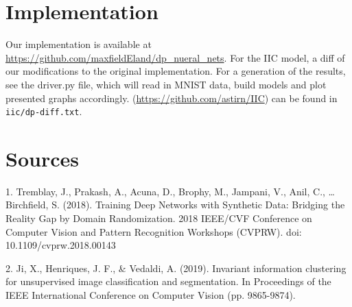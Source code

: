 \documentclass[12pt]{report}
\begin{document}
\section{Implementation}
Our implementation is available at \url{https://github.com/maxfieldEland/dp_nueral_nets}. For the IIC model, a diff of our modifications to the original implementation. For a generation of the results, see the driver.py file, which will read in MNIST data, build models and plot presented graphs accordingly.  (\url{https://github.com/astirn/IIC}) can be found in \texttt{iic/dp-diff.txt}.



\section{Sources}
1. Tremblay, J., Prakash, A., Acuna, D., Brophy, M., Jampani, V., Anil, C., … Birchfield, S. (2018). Training Deep Networks with Synthetic Data: Bridging the Reality Gap by Domain Randomization. 2018 IEEE/CVF Conference on Computer Vision and Pattern Recognition Workshops (CVPRW). doi: 10.1109/cvprw.2018.00143

2. Ji, X., Henriques, J. F., & Vedaldi, A. (2019). Invariant information clustering for unsupervised image classification and segmentation. In Proceedings of the IEEE International Conference on Computer Vision (pp. 9865-9874).

\end{document}

